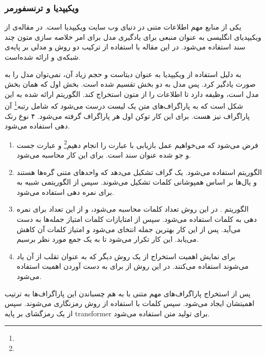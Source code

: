 \documentclass[12pt, a4paper, oneside]{report}
\begin{document}
\subsubsection{ویکیپدیا و ترنسفورمر}

یکی از منابع مهم اطلاعات متنی در دنیای وب سایت ویکیپدیا است. در مقاله‌ی 
\cite{liu2018generating}
از ویکیپدیای انگلیسی به عنوان منبعی برای یادگیری مدل برای امر خلاصه سازی متون چند سند استفاده می‌شود.
در این مقاله با استفاده از ترکیب دو روش
و
مدلی بر پایه‌ی شبکه‌ی
و
ارائه شده‌است.

به دلیل استفاده از ویکیپدیا به عنوان دیتاست و حجم زیاد آن، نمی‌توان مدل را به صورت
یادگیر کرد. پس مدل به دو بخش تقسیم شده است. بخش اول که همان بخش
مدل است، وظیفه دارد تا اطلاعات را از متون استخراج کند. الگوریتم ارائه شده به این شکل است که به پاراگراف‌های
متن یک لیست درست می‌شود که شامل رتبه\footnote{}
آن پاراگراف نیز هست. برای این کار
توکن اول هر پاراگراف گرفته می‌شود. ۴ نوع رنک دهی استفاده می‌شود.

\begin{enumerate}
    \item فرض می‌شود که می‌خواهیم عمل بازیابی با عبارت را انجام دهیم\footnote{}
          و عبارت جست و جو شده عنوان سند است. برای این کار
          محاسبه می‌شود.
    \item الگوریتم
          استفاده می‌شود. یک گراف تشکیل می‌دهد که واحدهای متنی گره‌ها هستند و یال‌ها بر اساس
          همپوشانی کلمات تشکیل می‌شوند. سپس از الگوریتمی شبیه به
          برای نمره دهی استفاده می‌شود.
    \item الگوریتم
          .
          در این روش تعداد کلمات محاسبه می‌شود، و از این تعداد برای نمره دهی به کلمات استفاده می‌شود.
          سپس از امتایازات کلمات امتیاز جمله‌ها به دست می‌آید. پس از این کار بهترین جمله انتخای می‌شود و
          امتیاز کلمات آن کاهش می‌یابد. این کار تکرار می‌شود تا به یک جمع مورد نظر برسیم.
    \item برای نمایش اهمیت استخراج‌ از یک روش دیگر که به عنوان تقلب از آن یاد می‌شوند
          استفاده می‌کنند. در این روش از
          برای به دست آوردن اهمیت استفاده می‌شود.
\end{enumerate}

پس از استخراج پاراگراف‌های مهم متنی با به هم چسباندن این پاراگراف‌ها به ترتیب اهمیتشان ایجاد می‌شود.
سپس کلمات با استفاده از روش
رمزنگاری می‌شوند. سپس از یک رمزگشای بر پایه
transformer
برای تولید متن استفاده می‌شود.
\end{document}
